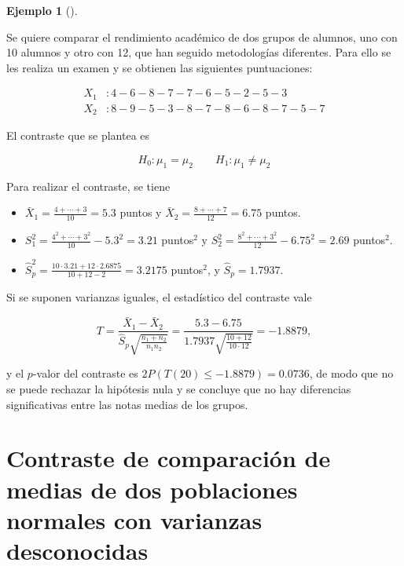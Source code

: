 \documentclass[
  a4paper,
]{scrreport}
\providecommand{\tightlist}{%
  \setlength{\itemsep}{0pt}\setlength{\parskip}{0pt}}\usepackage{longtable,booktabs,array}
\theoremstyle{plain}
\theoremstyle{definition}
\theoremstyle{definition}
\newtheorem{example}{Ejemplo}[chapter]
\theoremstyle{remark}
\begin{document}
\begin{example}[]\protect\hypertarget{exm-contraste-diferencia-medias-normales-varianzas-desconocidas-iguales}{}\label{exm-contraste-diferencia-medias-normales-varianzas-desconocidas-iguales}

Se quiere comparar el rendimiento académico de dos grupos de alumnos,
uno con 10 alumnos y otro con 12, que han seguido metodologías
diferentes. Para ello se les realiza un examen y se obtienen las
siguientes puntuaciones:

\begin{align*}
X_1 &: 4 - 6 - 8 - 7 - 7 - 6 - 5 - 2 - 5 - 3  \\
X_2 &: 8 - 9 - 5 - 3 - 8 - 7 - 8 - 6 - 8 - 7 - 5 - 7
\end{align*}

El contraste que se plantea es

\[
H_0: \mu_1=\mu_2\qquad H_1: \mu_1\neq \mu_2
\]

Para realizar el contraste, se tiene

\begin{itemize}
\tightlist
\item
  \(\bar{X}_1 = \frac{4+\cdots +3}{10}=5.3\) puntos y
  \(\bar{X}_2=\frac{8+\cdots +7}{12}=6.75\) puntos.
\item
  \(S_1^2= \frac{4^2+\cdots + 3^2}{10}-5.3^2=3.21\) puntos\(^2\) y
  \(S_2^2= \frac{8^2+\cdots +3^2}{12}-6.75^2=2.69\) puntos\(^2\).
\item
  \(\hat{S}_p^2 = \frac{10\cdot 3.21+12\cdot 2.6875}{10+12-2}= 3.2175\)
  puntos\(^2\), y \(\hat S_p=1.7937\).
\end{itemize}

Si se suponen varianzas iguales, el estadístico del contraste vale

\[
T=\frac{\bar{X}_1-\bar{X}_2}{\hat{S}_p\sqrt{\frac{n_1+n_2}{n_1n_2}}} = \frac{5.3-6.75}{1.7937\sqrt{\frac{10+12}{10\cdot 12}}} = -1.8879,
\]

y el \(p\)-valor del contraste es \(2P(T(20)\leq -1.8879) = 0.0736\), de
modo que no se puede rechazar la hipótesis nula y se concluye que no hay
diferencias significativas entre las notas medias de los grupos.

\end{example}

\section{Contraste de comparación de medias de dos poblaciones normales
con varianzas
desconocidas}\label{contraste-de-comparaciuxf3n-de-medias-de-dos-poblaciones-normales-con-varianzas-desconocidas}
\end{document}
